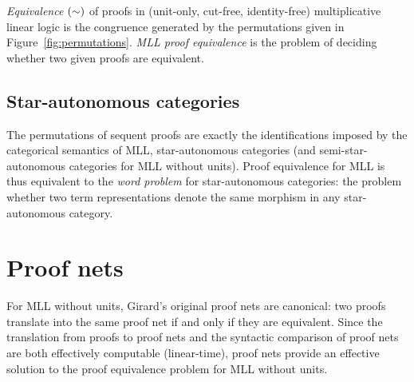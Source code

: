 \documentclass{lmcs}
\let\capsabbrev=\uppercase
\begin{document}
\begin{definition}[\capsabbrev{mll} proof equivalence]
\label{def:equivalence}
\emph{Equivalence} $(\perm)$ of proofs in (unit-only, cut-free, identity-free) multiplicative linear logic is the congruence generated by the permutations given in Figure~\ref{fig:permutations}. \emph{\capsabbrev{mll} proof equivalence} is the problem of deciding whether two given proofs are equivalent.
\end{definition}


\subsection*{Star-autonomous categories}


The permutations of sequent proofs are exactly the identifications imposed by the categorical semantics of \capsabbrev{mll}, star-autonomous categories \cite{Barr-1991} (and semi-star-autonomous categories \cite{Houston-2008,Heijltjes-Strassburger} for \capsabbrev{mll} without units). Proof equivalence for \capsabbrev{mll} is thus equivalent to the \emph{word problem} for star-autonomous categories: the problem whether two term representations denote the same morphism in any star-autonomous category.



\section*{Proof nets}


For \capsabbrev{mll} without units, Girard's original proof nets \cite{Girard-1987} are canonical: two proofs translate into the same proof net if and only if they are equivalent. Since the translation from proofs to proof nets and the syntactic comparison of proof nets are both effectively computable (linear-time), proof nets provide an effective solution to the proof equivalence problem for \capsabbrev{mll} without units.
\end{document}
